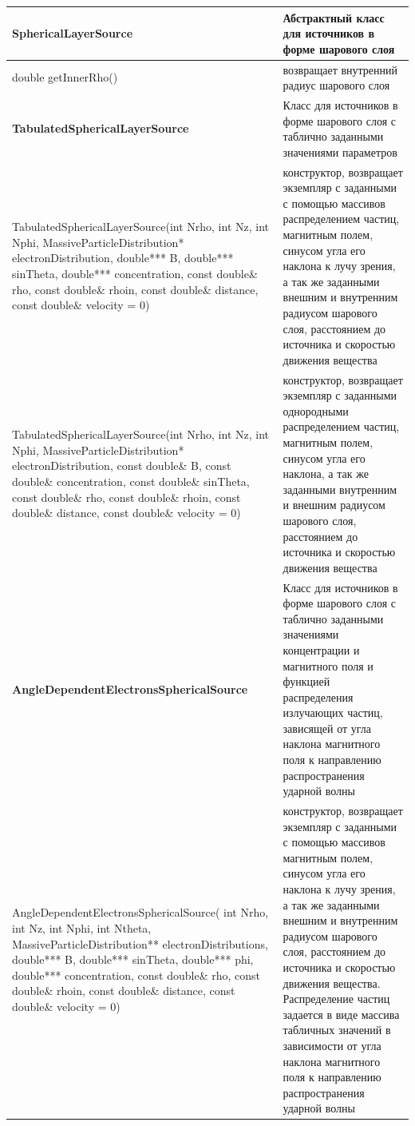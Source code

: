 \begin{small}
\begin{xtabular}{|p{0.5\textwidth}|p{0.5\textwidth}|}
		\hline
		\textbf{SphericalLayerSource} & Абстрактный класс для источников в форме шарового слоя\\
		\hline
		double getInnerRho() & возвращает внутренний радиус шарового слоя\\
		\hline
		\textbf{TabulatedSphericalLayerSource} & Класс для источников в форме шарового слоя с таблично заданными значениями параметров\\
		\hline
		TabulatedSphericalLayerSource(int Nrho, int Nz, int Nphi, MassiveParticleDistribution* electronDistribution, double*** B, double*** sinTheta, double*** concentration, const double\& rho, const double\& rhoin, const double\& distance, const double\& velocity = 0) & конструктор, возвращает экземпляр с заданными с помощью массивов распределением частиц, магнитным полем, синусом угла его наклона к лучу зрения, а так же заданными внешним и внутренним радиусом шарового слоя, расстоянием до источника и скоростью движения вещества\\
		\hline
		TabulatedSphericalLayerSource(int Nrho, int Nz, int Nphi, MassiveParticleDistribution* electronDistribution, const double\& B, const double\& concentration, const double\& sinTheta, const double\& rho, const double\& rhoin, const double\& distance, const double\& velocity = 0) &  конструктор, возвращает экземпляр с заданными однородными распределением частиц, магнитным полем, синусом угла его наклона, а так же заданными внутренним и внешним радиусом шарового слоя, расстоянием до источника и скоростью движения вещества\\
		\hline
		\textbf{AngleDependentElectronsSphericalSource} & Класс для источников в форме шарового слоя с таблично заданными значениями концентрации и магнитного поля и функцией распределения излучающих частиц, зависящей от угла наклона магнитного поля к направлению распространения ударной волны\\
		\hline
		AngleDependentElectronsSphericalSource( int Nrho, int Nz, int Nphi, int Ntheta, MassiveParticleDistribution** electronDistributions, double*** B, double*** sinTheta, double*** phi, double*** concentration, const double\& rho, const double\& rhoin, const double\& distance, const double\& velocity = 0) & конструктор, возвращает экземпляр с заданными с помощью массивов магнитным полем, синусом угла его наклона к лучу зрения, а так же заданными внешним и внутренним радиусом шарового слоя, расстоянием до источника и скоростью движения вещества. Распределение частиц задается в виде массива табличных значений в зависимости от угла наклона магнитного поля к направлению распространения ударной волны\\

\end{xtabular}
\end{small}
